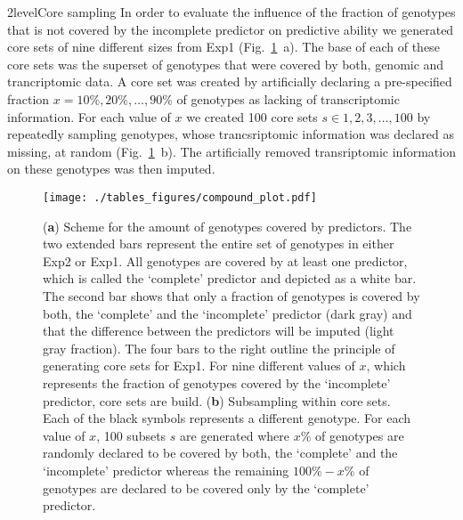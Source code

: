 \documentclass[12pt,titlepage]{article}
\begin{document}
\Genetics2level{Core sampling}
In order to evaluate the influence of the fraction of genotypes that is not
covered by the incomplete predictor on predictive ability we generated core
sets of nine different sizes from Exp1 (Fig.~\ref{fig:compound-plot}~a).
The base of each of these core sets was the superset of genotypes that were
covered by both, genomic and trancriptomic data.
A core set was created by artificially declaring a pre-specified fraction 
$x = {10\%, 20\%, \dots, 90\%}$ of genotypes as lacking of transcriptomic 
information.
For each value of $x$ we created 100 core sets $s \in {1, 2, 3, \dots, 100}$ by
repeatedly sampling genotypes, whose trancsriptomic information was declared
as missing, at random (Fig.~\ref{fig:compound-plot}~b).
The artificially removed transriptomic information on these genotypes was then
imputed.

\begin{figure}[H]
  \centering
  \texttt{[image: ./tables\_figures/compound\_plot.pdf]}
  \caption{
  (\textbf{a}) Scheme for the amount of genotypes covered by predictors.
  The two extended bars represent the entire set of genotypes in either
  Exp2 or Exp1.
  All genotypes are covered by at least one predictor, which is called the
  `complete' predictor and depicted as a white bar.
  The second bar shows that only a fraction of genotypes is covered by both,
  the `complete' and the `incomplete' predictor (dark gray) and that the
  difference between the predictors will be imputed (light gray fraction).
  The four bars to the right outline the principle of generating core sets for
  Exp1.
  For nine different values of $x$, which represents the fraction of genotypes
  covered by the `incomplete' predictor, core sets are build.
  (\textbf{b}) Subsampling within core sets.
  Each of the black symbols represents a different genotype.
  For each value of $x$, 100 subsets $s$ are generated where $x\%$ of genotypes
  are randomly declared to be covered by both, the `complete' and the
  `incomplete' predictor whereas the remaining $100\% - x\%$ of genotypes
  are declared to be covered only by the `complete' predictor.
  }
\label{fig:compound-plot}
\end{figure}
\end{document}
